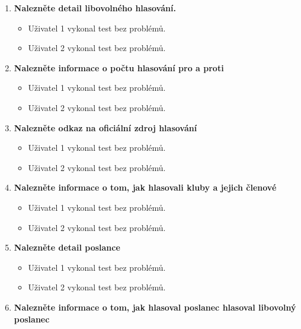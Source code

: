 \begin{enumerate}
	\item \textbf{Nalezněte detail libovolného hlasování.}
	
		\begin{itemize}
			\item Uživatel 1 vykonal test bez problémů.
			\item Uživatel 2 vykonal test bez problémů.
		\end{itemize}
	
	\item \textbf{Nalezněte informace o počtu hlasování pro a proti}
	
		\begin{itemize}
			\item Uživatel 1 vykonal test bez problémů.
			\item Uživatel 2 vykonal test bez problémů.
		\end{itemize}
	
	\item \textbf{Nalezněte odkaz na oficiální zdroj hlasování}
	
		\begin{itemize}
			\item Uživatel 1 vykonal test bez problémů.
			\item Uživatel 2 vykonal test bez problémů.
		\end{itemize}
	
	\item \textbf{Nalezněte informace o tom, jak hlasovali kluby a jejich členové}
	
		\begin{itemize}
			\item Uživatel 1 vykonal test bez problémů.
			\item Uživatel 2 vykonal test bez problémů.
		\end{itemize}
		
	
	\item \textbf{Nalezněte detail poslance}
	
		\begin{itemize}
			\item Uživatel 1 vykonal test bez problémů.
			\item Uživatel 2 vykonal test bez problémů.
		\end{itemize}
	
	
	\item \textbf{Nalezněte informace o tom, jak hlasoval poslanec hlasoval libovolný poslanec}
	

\end{enumerate}
